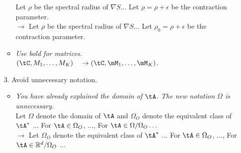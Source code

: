 \documentclass[11pt]{article}
\begin{document}
\begin{enumerate}
\begin{itemize}
Let $\rho$ be the spectral radius of $\nabla S$... Let $\rho = \rho + \epsilon$ be the contraction parameter.\\
$\rightarrow$ Let $\rho$ be the spectral radius of $\nabla S$... Let $\rho_0 = \rho + \epsilon$ be the contraction parameter.
\item \textit{Use bold for matrices.}\\
$(\tC, M_1, \dots,M_K) \quad \rightarrow (\tC, \mM_1,\dots,\mM_K)$. 
    \end{itemize}
    \item[3.] Avoid unnecessary notation. 
    \begin{itemize} 
        \item \textit{You have already explained the domain of $\tA$. The new notation $\Omega$ is unnecessary.}\\
        Let $\Omega$ denote the domain of $\tA$ and $\Omega_O$ denote the equivalent class of $\tA^*$ ... For $\tA \in \Omega_O$, $\dots$, For $\tA \in \Omega/\Omega_O \dots$ \\
        $\rightarrow$ Let $\Omega_O$ denote the equivalent class of $\tA^*$ ... For $\tA \in \Omega_O$, $\dots$, For $\tA \in \mathbb{R}^d/\Omega_O$ $\dots$
    \end{itemize}
\end{enumerate}
\end{document}
